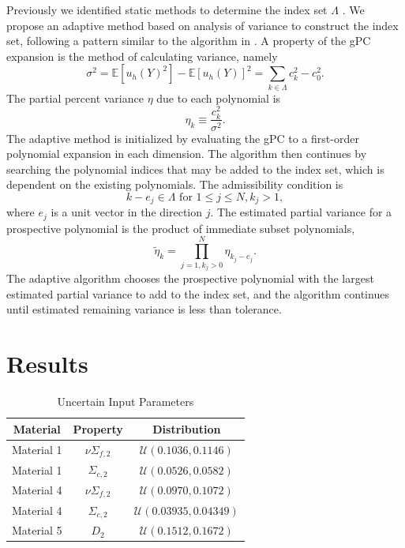 \documentclass{anstrans} \usepackage{amsmath} \usepackage{amssymb}
\newcommand{\expv}[1]{\ensuremath{\mathbb{E}[ #1]}} \newcommand{\xs}[2]{\ensuremath{\Sigma_{#1}^{(#2)}}}
\begin{document}
Previously we identified static methods to determine the index set $\Lambda$ \cite{ans2014}.  We propose an
adaptive method based on analysis of variance to construct the index set, following a pattern similar to the
algorithm in \cite{Ayres}.  A property of the gPC expansion is the method of calculating variance, namely
\begin{equation}
  \sigma^2 = \expv{u_h(Y)^2} - \expv{u_h(Y)}^2 = \sum_{k\in\Lambda}c_k^2 - c_0^2.
\end{equation}
The partial percent variance $\eta$ due to each polynomial is
\begin{equation}
  \eta_k \equiv \frac{c_k^2}{\sigma^2}.
\end{equation}
The adaptive method is initialized by evaluating the gPC to a first-order polynomial expansion in each
dimension.  The algorithm then continues by searching the polynomial indices that may be added to the index
set, which is dependent on the existing polynomials.  The admissibility condition is
\begin{equation}
  k-e_j\in\Lambda \text{  for } 1\leq j\leq N, k_j>1,
\end{equation}
where $e_j$ is a unit vector in the direction $j$.  The estimated partial variance for a prospective polynomial 
is the product of immediate subset polynomials,
\begin{equation}
  \tilde \eta_k = \prod_{j=1,k_j>0}^N \eta_{k_j-e_j}.
\end{equation}
The adaptive algorithm chooses the prospective polynomial with the largest estimated partial variance to add
to the index set, and the algorithm continues until estimated remaining variance is less than tolerance.

\section{Results}\label{results}
\begin{table}[H] 
  \centering 
  \begin{tabular}{c|c|c} 
    Material & Property & Distribution \\ \hline 
    Material 1 & $\nu\Sigma_{f,2}$ & $\mathcal{U}(0.1036,0.1146)$ \\ 
    Material 1 & $\Sigma_{c,2}$ & $\mathcal{U}(0.0526,0.0582)$  \\ 
    Material 4 & $\nu\Sigma_{f,2}$ & $\mathcal{U}(0.0970,0.1072)$ \\ 
    Material 4 & $\Sigma_{c,2}$ & $\mathcal{U}(0.03935,0.04349)$  \\ 
    Material 5 & $D_2$ & $\mathcal{U}(0.1512,0.1672)$
  \end{tabular} 
  \caption{Uncertain Input Parameters} 
  \label{params} 
\end{table}
\end{document}

